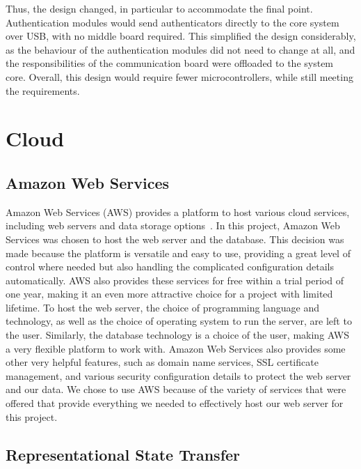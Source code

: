 \documentclass[12pt]{report}
\let\Oldsection\section
\renewcommand{\section}{\FloatBarrier\Oldsection}
\let\Oldsubsection\subsection
\renewcommand{\subsection}{\FloatBarrier\Oldsubsection}
\begin{document}
Thus, the design changed, in particular to accommodate the final point. Authentication modules would send 
authenticators directly to the core system over USB, with no middle board required. This simplified the design 
considerably, as the behaviour of the authentication modules did not need to change at all, and the responsibilities 
of the communication board were offloaded to the system core. Overall, this design would require fewer 
microcontrollers, while still meeting the requirements.


\section{Cloud} \label{cloud}

\subsection{Amazon Web Services} \label{amazon-web-services}

Amazon Web Services (AWS) provides a platform to host various cloud services,
including web servers and data storage options~\autocite{AMAZONWEBSERVICES}. In this
project, Amazon Web Services was chosen to host the web server and the database. This
decision was made because the platform is versatile and easy to use, providing a great level of
control where needed but also handling the complicated configuration details automatically.
AWS also provides these services for free within a trial period of one year, making it an even
more attractive choice for a project with limited lifetime. To host the web server, the choice of
programming language and technology, as well as the choice of operating system to run the
server, are left to the user. Similarly, the database technology is a choice of the user, making
AWS a very flexible platform to work with. Amazon Web Services also provides some other
very helpful features, such as domain name services, SSL certificate management, and various
security configuration details to protect the web server and our data. We chose to use AWS
because of the variety of services that were offered that provide everything we needed to
effectively host our web server for this project.

\subsection{Representational State Transfer} \label{representational-state-transfer}
\end{document}
